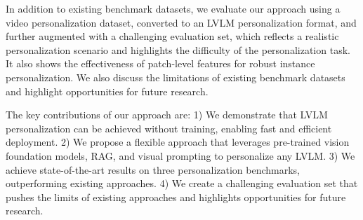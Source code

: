 

In addition to existing benchmark datasets, we evaluate our approach using a video personalization dataset, converted to an LVLM personalization format, and further augmented with a challenging evaluation set, which reflects a realistic personalization scenario and highlights the difficulty of the personalization task. It also shows the effectiveness of patch-level features for robust instance personalization. We also discuss the limitations of existing benchmark datasets and highlight opportunities for future research.

The key contributions of our approach are:
1) We demonstrate that LVLM personalization can be achieved without training, enabling fast and efficient deployment.
2) We propose a flexible approach that leverages pre-trained vision foundation models, RAG, and visual prompting to personalize any LVLM.
3) We achieve state-of-the-art results on three personalization benchmarks, outperforming existing approaches.
4) We create a challenging evaluation set that pushes the limits of existing approaches and highlights opportunities for future research.


